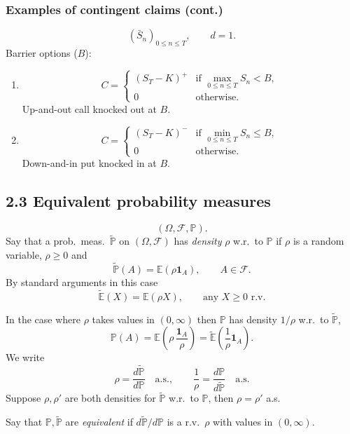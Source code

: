 \documentclass[11pt,a4paper]{article}
\begin{document}
\subsubsection*{Examples of contingent claims (cont.)}

\[
(\bar S_n)_{0\leq n\leq T},\qquad d=1.
\]
\noindent Barrier options ($B$):
\begin{enumerate}
    \item[(c)]
    \[
    C=\begin{cases}
    (S_T-K)^+ & \text{if }\displaystyle\max_{0\leq n\leq T}S_n<B,\\
    0 & \text{otherwise}.
    \end{cases}
    \]
    Up-and-out call knocked out at $B$.

    \item[(d)]
    \[
    C=\begin{cases}
    (S_T-K)^- & \text{if }\displaystyle\min_{0\leq n\leq T}S_n\leq B,\\
    0 & \text{otherwise}.
    \end{cases}
    \]
    Down-and-in put knocked in at $B$.
\end{enumerate}

\subsection*{2.3 Equivalent probability measures}

\[
(\Omega,\mathcal F,\mathbb P).
\]
Say that a prob.\ meas.\ $\widetilde{\mathbb P}$ on $(\Omega,\mathcal F)$
has \emph{density} $\rho$ w.r.\ to $\mathbb P$ if $\rho$ is a random variable,
$\rho\geq0$ and
\[
\widetilde{\mathbb P}(A)=\mathbb E(\rho\mathbf1_A),
\qquad A\in\mathcal F.
\]
By standard arguments in this case
\[
\widetilde{\mathbb E}(X)=\mathbb E(\rho X),
\qquad\text{any }X\geq0\text{ r.v.}
\]

In the case where $\rho$ takes values in $(0,\infty)$ then $\mathbb P$
has density $1/\rho$ w.r.\ to $\widetilde{\mathbb P}$,
\[
\mathbb P(A)=\mathbb E\left(\rho\,\frac{\mathbf1_A}{\rho}\right)
=\widetilde{\mathbb E}\left(\frac1\rho\mathbf1_A\right).
\]
We write
\[
\rho=\frac{d\widetilde{\mathbb P}}{d\mathbb P}\quad\text{a.s.},
\qquad
\frac1\rho=\frac{d\mathbb P}{d\widetilde{\mathbb P}}\quad\text{a.s.}
\]
Suppose $\rho,\rho'$ are both densities for $\widetilde{\mathbb P}$
w.r.\ to $\mathbb P$, then $\rho=\rho'$ a.s.

Say that $\mathbb P,\widetilde{\mathbb P}$ are \emph{equivalent} if
$d\widetilde{\mathbb P}/d\mathbb P$ is a r.v.\ $\rho$ with values in $(0,\infty)$.
\end{document}
